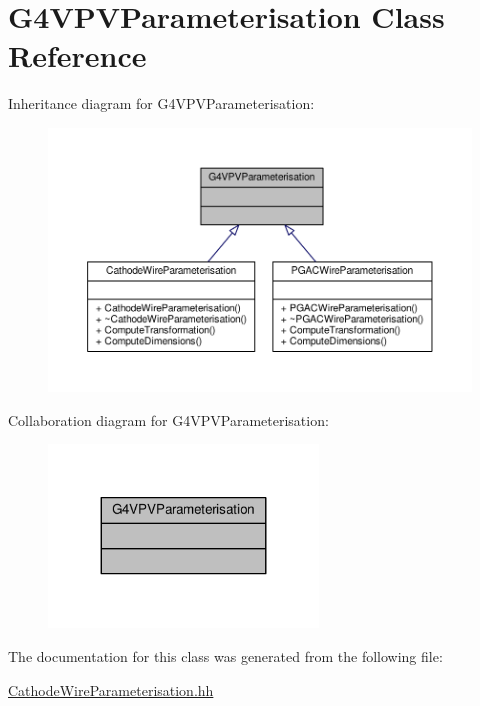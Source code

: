 \hypertarget{classG4VPVParameterisation}{}\section{G4\+V\+P\+V\+Parameterisation Class Reference}
\label{classG4VPVParameterisation}


Inheritance diagram for G4\+V\+P\+V\+Parameterisation\+:
\nopagebreak
\begin{figure}[H]
\begin{center}
\leavevmode
\includegraphics[width=350pt]{classG4VPVParameterisation__inherit__graph}
\end{center}
\end{figure}


Collaboration diagram for G4\+V\+P\+V\+Parameterisation\+:
\nopagebreak
\begin{figure}[H]
\begin{center}
\leavevmode
\includegraphics[width=203pt]{classG4VPVParameterisation__coll__graph}
\end{center}
\end{figure}


The documentation for this class was generated from the following file\+:\begin{DoxyCompactItemize}
\item 
\hyperlink{CathodeWireParameterisation_8hh}{Cathode\+Wire\+Parameterisation.\+hh}\end{DoxyCompactItemize}
